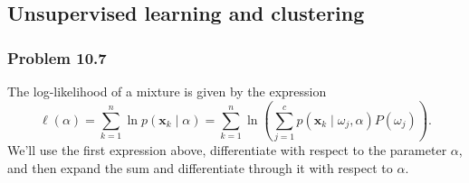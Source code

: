 \documentclass[12pt, a4paper]{article}
\newcommand{\vect}[1]{\bm{#1}}
\begin{document}
{\subsection{Unsupervised learning and clustering}


\subsubsection*{Problem 10.7}
The log-likelihood of a mixture is given by the expression
\begin{equation*}
	\ell(\alpha) = \sum_{k=1}^{n} \ln p \left( \vect{x}_k \mid \alpha \right)
	= \sum_{k=1}^{n} \ln  \left( 
	\sum_{j=1}^{c} p \left( \vect{x}_k \mid \omega_j,  \alpha \right) P(\omega_j)
	 \right).
\end{equation*}
We'll use the first expression above, differentiate with respect to the parameter $\alpha$, and then expand the sum and differentiate through it with respect to $\alpha$.

}
\end{document}
